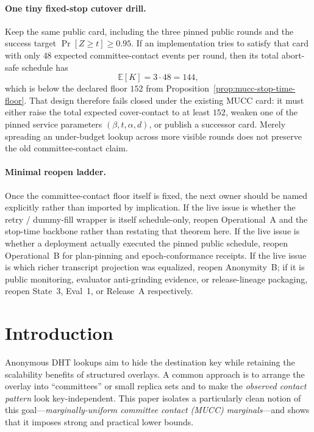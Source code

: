 \documentclass[11pt]{article}
\newcommand{\E}{\mathbb{E}}
\begin{document}
\paragraph{One tiny fixed-stop cutover drill.}
Keep the same public card, including the three pinned public rounds and the success target $\Pr[Z\ge t]\ge 0.95$.
If an implementation tries to satisfy that card with only $48$ expected committee-contact events per round, then its total abort-safe schedule has
\[
\E[K]=3\cdot 48 = 144,
\]
which is below the declared floor $152$ from Proposition~\ref{prop:mucc-stop-time-floor}.
That design therefore fails closed under the existing MUCC card: it must either raise the total expected cover-contact to at least $152$, weaken one of the pinned service parameters $(\beta,t,\alpha,d)$, or publish a successor card.
Merely spreading an under-budget lookup across more visible rounds does not preserve the old committee-contact claim.

\paragraph{Minimal reopen ladder.}
Once the committee-contact floor itself is fixed, the next owner should be named explicitly rather than imported by implication.
If the live issue is whether the retry / dummy-fill wrapper is itself schedule-only, reopen Operational~A and the stop-time backbone rather than restating that theorem here.\cite{series:operationalA,series:stoptimeaddendum}
If the live issue is whether a deployment actually executed the pinned public schedule, reopen Operational~B for plan-pinning and epoch-conformance receipts.\cite{series:operationalB}
If the live issue is which richer transcript projection was equalized, reopen Anonymity~B; if it is public monitoring, evaluator anti-grinding evidence, or release-lineage packaging, reopen State~3, Eval~1, or Release~A respectively.\cite{series:profiling,series:state3,series:evalnotary,series:release}

\section{Introduction}
Anonymous DHT lookups aim to hide the destination key while retaining the scalability benefits of structured overlays.
A common approach is to arrange the overlay into ``committees'' or small replica sets and to make the \emph{observed contact pattern} look key-independent.
This paper isolates a particularly clean notion of this goal---\emph{marginally-uniform committee contact (MUCC) marginals}---and shows that it imposes strong and practical lower bounds.
\end{document}
